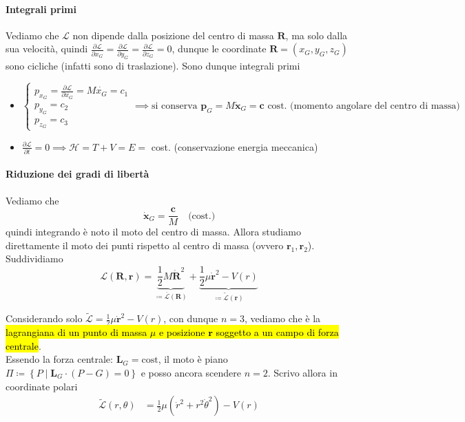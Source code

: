 \documentclass[a4paper,10pt]{article}
\theoremstyle{definition}
\newcommand{\bv}{\boldsymbol} %
\theoremstyle{indentdefinition}
\theoremstyle{indenttheorem}
\theoremstyle{myremark}
\theoremstyle{indentgeneral}
\begin{document}
\paragraph{Integrali primi}
Vediamo che $\mathcal{L}$ non dipende dalla posizione del centro di massa $\bv{R}$, ma solo dalla sua velocità, quindi $\frac{\partial\mathcal{L}}{\partial x_G}=\frac{\partial\mathcal{L}}{\partial y_G}=\frac{\partial\mathcal{L}}{\partial z_G}=0$, dunque le coordinate $\boldsymbol{R}=\left(x_{G},y_{G},z_{G}\right)$ sono
 cicliche (infatti sono di traslazione). Sono dunque integrali primi
 \begin{itemize}
     \item $\begin{cases}
         p_{x_{G}}  =\frac{\partial\mathcal{L}}{\partial\dot{x_{G}}}=M\dot{x_{G}}=c_{1} \\
         p_{y_{G}}  =c_{2} \\
         p_{z_{G}} =c_{3}
     \end{cases}\implies \text{si conserva $\bv{p}_G=M\dot{\bv{x}}_G=\bv{c}$ cost. (momento angolare del centro di massa)}$
     \item $\frac{\partial\mathcal{L}}{\partial t}  =0\implies \mathcal{H}=T+V=E=$ cost. (conservazione energia meccanica)
 \end{itemize}
\paragraph{Riduzione dei gradi di libertà} Vediamo che
$$\dot{\bv{x}}_G=\frac{\bv{c}}{M}\quad\text{(cost.)}$$
quindi integrando è noto il moto del centro di massa. Allora studiamo direttamente il moto dei punti rispetto al centro di massa (ovvero $\bv{r}_1,\bv{r}_2$). Suddividiamo
$$\mathcal{L}(\bv{R},\bv{r}) =\underbrace{\frac{1}{2}M\dot{\boldsymbol{R}}^{2}}_{\coloneqq \overline{\mathcal{L}}(\bv{R})}+\underbrace{\frac{1}{2}\mu\dot{\boldsymbol{r}}^{2}-V\left(r\right)}_{\coloneqq \widetilde{\mathcal{L}}(\bv{r})}$$

Considerando solo $\widetilde{\mathcal{L}}=\frac{1}{2}\mu\dot{\boldsymbol{r}}^{2}-V\left(r\right)$,
con dunque $n=3$, vediamo che è la \hl{lagrangiana di un punto di massa $\mu$ e posizione
$\boldsymbol{r}$ soggetto a un campo di forza centrale}. \\
Essendo la forza centrale: $\boldsymbol{L}_{G}=\text{cost}$,
il moto è piano $\Pi\coloneqq\left\{ P\mid\boldsymbol{L}_{G}\cdot\left(P-G\right)=0\right\} $
e posso ancora scendere $n=2$. Scrivo allora in coordinate polari
\begin{align*}
\widetilde{\mathcal{L}}(r,\theta) & =\frac{1}{2}\mu\left(\dot{r}^{2}+r^{2}\dot{\theta}^{2}\right)-V\left(r\right)
\end{align*}
\end{document}
